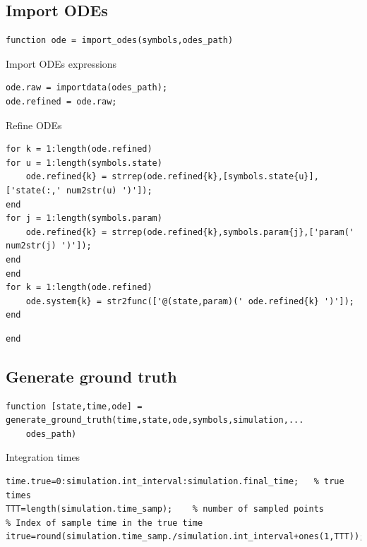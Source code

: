 \color{black}
\begin{par}
\section{ Import ODEs }
\end{par} \vspace{1em}
\color{RoyalPurple}\begin{verbatim}
function ode = import_odes(symbols,odes_path)
\end{verbatim}
\color{black}
\begin{par}
Import ODEs expressions
\end{par} \vspace{1em}
\color{RoyalPurple}\begin{verbatim}
ode.raw = importdata(odes_path);
ode.refined = ode.raw;
\end{verbatim}
\color{black}
\begin{par}
Refine ODEs
\end{par} \vspace{1em}
\color{RoyalPurple}\begin{verbatim}
for k = 1:length(ode.refined)
for u = 1:length(symbols.state)
    ode.refined{k} = strrep(ode.refined{k},[symbols.state{u}],['state(:,' num2str(u) ')']);
end
for j = 1:length(symbols.param)
    ode.refined{k} = strrep(ode.refined{k},symbols.param{j},['param(' num2str(j) ')']);
end
end
for k = 1:length(ode.refined)
    ode.system{k} = str2func(['@(state,param)(' ode.refined{k} ')']);
end
\end{verbatim}
\color{black}
\color{RoyalPurple}\begin{verbatim}
end
\end{verbatim}
\color{black}
\begin{par}
\section{ Generate ground truth }
\end{par} \vspace{1em}
\color{RoyalPurple}\begin{verbatim}
function [state,time,ode] = generate_ground_truth(time,state,ode,symbols,simulation,...
    odes_path)
\end{verbatim}
\color{black}
\begin{par}
Integration times
\end{par} \vspace{1em}
\color{RoyalPurple}\begin{verbatim}
time.true=0:simulation.int_interval:simulation.final_time;   % true times
TTT=length(simulation.time_samp);    % number of sampled points
% Index of sample time in the true time
itrue=round(simulation.time_samp./simulation.int_interval+ones(1,TTT));
\end{verbatim}
